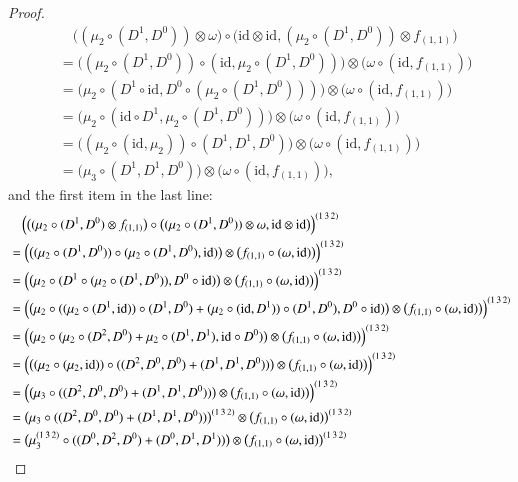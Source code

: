 \documentclass[12pt]{amsart}
\theoremstyle{definition}
\newcommand{\id}{\mathrm{id}}
\newcommand{\ot}{\otimes}
\begin{document}
\begin{proof}
\begin{align*}
	&\quad\big((\mu_2\circ(D^1,D^0))\ot \omega\big)\circ\big(\id\ot \id,(\mu_2\circ(D^1,D^0))\ot f_{(1,1)}\big)\\
	&=\big((\mu_2\circ(D^1,D^0))\circ (\id,\mu_2\circ(D^1,D^0))\big)\ot \big(\omega\circ (\id, f_{(1,1)})\big)\\
	&=\big(\mu_2\circ (D^1\circ\id,D^0\circ(\mu_2\circ(D^1,D^0)))\big)\ot \big(\omega\circ (\id, f_{(1,1)})\big)\\
	&=\big(\mu_2\circ (\id\circ D^1,\mu_2\circ(D^1,D^0))\big)\ot \big(\omega\circ (\id, f_{(1,1)})\big)\\
	&=\big((\mu_2\circ(\id,\mu_2))\circ (D^1,D^1,D^0)\big)\ot \big(\omega\circ (\id, f_{(1,1)})\big)\\
	&=\big(\mu_3\circ(D^1,D^1,D^0)\big)\ot \big(\omega\circ (\id, f_{(1,1)})\big),
\end{align*}
and the first item in the last line:
\begin{align*}
	&\quad\Bigl(\bigl((\mu_2\circ(D^1,D^0)\ot f_{(1,1)}\bigr)\circ\bigl((\mu_2\circ(D^1,D^0))\ot \omega,\id\ot\id\bigr)\Bigr)^{(1\,3\,2)}\\
	&=\Bigl(\bigl((\mu_2\circ(D^1,D^0))\circ (\mu_2\circ(D^1,D^0),\id)\bigr)\ot \bigl(f_{(1,1)}\circ(\omega,\id)\bigr)\Bigr)^{(1\,3\,2)}\\
	&=\Bigl(\bigl(\mu_2\circ (D^1\circ(\mu_2\circ(D^1,D^0)),D^0\circ\id)\bigr)\ot \bigl(f_{(1,1)}\circ(\omega,\id)\bigr)\Bigr)^{(1\,3\,2)}\\
	&=\Bigl(\bigl(\mu_2\circ ((\mu_2\circ(D^1,\id))\circ(D^1,D^0)+(\mu_2\circ(\id,D^1))\circ(D^1,D^0),D^0\circ\id)\bigr)\ot \bigl(f_{(1,1)}\circ(\omega,\id)\bigr)\Bigr)^{(1\,3\,2)}\\
	&=\Bigl(\bigl(\mu_2\circ (\mu_2\circ(D^2,D^0)+\mu_2\circ(D^1,D^1),\id\circ D^0)\bigr)\ot \bigl(f_{(1,1)}\circ(\omega,\id)\bigr)\Bigr)^{(1\,3\,2)}\\
	&=\Bigl(\bigl((\mu_2\circ(\mu_2,\id)) \circ((D^2,D^0,D^0)+(D^1,D^1,D^0))\bigr)\ot \bigl(f_{(1,1)}\circ(\omega,\id)\bigr)\Bigr)^{(1\,3\,2)}\\
	&=\Bigl(\bigl(\mu_3\circ((D^2,D^0,D^0)+(D^1,D^1,D^0))\bigr)\ot \bigl(f_{(1,1)}\circ(\omega,\id)\bigr)\Bigr)^{(1\,3\,2)}\\
	&=\bigl(\mu_3\circ((D^2,D^0,D^0)+(D^1,D^1,D^0))\bigr)^{(1\,3\,2)}\ot \bigl(f_{(1,1)}\circ(\omega,\id)\bigr)^{(1\,3\,2)}\\
	&=\bigl(\mu_3^{(1\,3\,2)}\circ((D^0,D^2,D^0)+(D^0,D^1,D^1))\bigr)\ot \bigl(f_{(1,1)}\circ(\omega,\id)\bigr)^{(1\,3\,2)}\\

\end{align*}
\end{proof}
\end{document}
